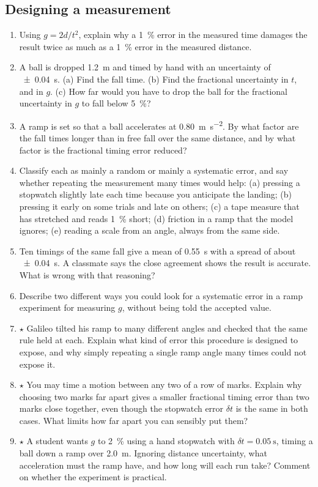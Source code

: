 \documentclass[11pt,twoside,openany]{book}
\newcounter{check}[chapter]
\begin{document}
\subsection*{Designing a measurement}
\begin{enumerate}[label=\textbf{\thechapter.\arabic*},resume=exercises,leftmargin=*]
  \item Using $g = 2d/t^2$, explain why a \SI{1}{\percent} error in the measured time damages the result twice as much as a \SI{1}{\percent} error in the measured distance.
  \item A ball is dropped \SI{1.2}{\metre} and timed by hand with an uncertainty of \SI{\pm0.04}{\second}. (a) Find the fall time. (b) Find the fractional uncertainty in $t$, and in $g$. (c) How far would you have to drop the ball for the fractional uncertainty in $g$ to fall below \SI{5}{\percent}?
  \item A ramp is set so that a ball accelerates at \SI{0.80}{\metre\per\second\squared}. By what factor are the fall times longer than in free fall over the same distance, and by what factor is the fractional timing error reduced?
  \item Classify each as mainly a random or mainly a systematic error, and say whether repeating the measurement many times would help: (a) pressing a stopwatch slightly late each time because you anticipate the landing; (b) pressing it early on some trials and late on others; (c) a tape measure that has stretched and reads \SI{1}{\percent} short; (d) friction in a ramp that the model ignores; (e) reading a scale from an angle, always from the same side.
  \item Ten timings of the same fall give a mean of \SI{0.55}{\second} with a spread of about \SI{\pm0.04}{\second}. A classmate says the close agreement shows the result is accurate. What is wrong with that reasoning?
  \item Describe two different ways you could look for a systematic error in a ramp experiment for measuring $g$, without being told the accepted value.
  \item $\star$ Galileo tilted his ramp to many different angles and checked that the same rule held at each. Explain what kind of error this procedure is designed to expose, and why simply repeating a single ramp angle many times could not expose it.
  \item $\star$ You may time a motion between any two of a row of marks. Explain why choosing two marks far apart gives a smaller fractional timing error than two marks close together, even though the stopwatch error $\delta t$ is the same in both cases. What limits how far apart you can sensibly put them?
  \item $\star$ A student wants $g$ to \SI{2}{\percent} using a hand stopwatch with $\delta t = \SI{0.05}{\second}$, timing a ball down a ramp over \SI{2.0}{\metre}. Ignoring distance uncertainty, what acceleration must the ramp have, and how long will each run take? Comment on whether the experiment is practical.
\end{enumerate}
\end{document}
